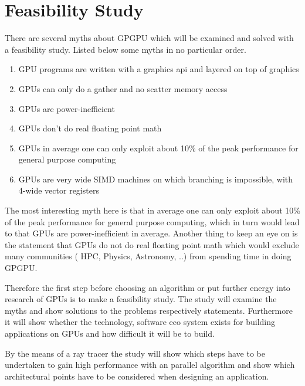 \chapter{Feasibility Study}
\label{chap:feas}
There are several myths about \gls{GPGPU} which will be examined and solved 
with a feasibility study. Listed below some myths in no particular order.
\begin{enumerate}
	\item \gls{GPU} programs are written with a graphics api and layered on top 
		of graphics
	\label{enum:api}
	\item \glspl{GPU} can only do a gather and no scatter memory access
	\label{enum:gather}
	\item \glspl{GPU} are power-inefficient
	\label{enum:ineff}
	\item \glspl{GPU} don't do real floating point math
	\label{enum:float}
	\item \glspl{GPU} in average one can only exploit about 10\% of the peak 
		performance for general purpose computing
	\label{enum:exploit}
	\item \glspl{GPU} are very wide \gls{SIMD} machines on which branching is 	  
		impossible, with 4-wide vector registers
 	\label{enum:simd}
\end{enumerate}

The most interesting myth here is that in average one can only exploit about
10\% of the peak performance for general purpose computing, which in turn would 
lead to that \glspl{GPU} are power-inefficient in average. Another thing to 
keep an eye on is the statement that \glspl{GPU} do not do real floating point
math which would exclude many communities ( \gls{HPC}, Physics, Astronomy, ..)
 from spending time in doing \gls{GPGPU}. 

Therefore the first step before choosing an algorithm or put further energy into
research of \glspl{GPU} is to make a feasibility study. The study will examine
the myths and show solutions to the problems respectively statements.
Furthermore it will show whether the technology, software eco system exists for
building applications on \glspl{GPU} and how difficult it will be to build.

By the means of a ray tracer the study will show which steps have to be 
undertaken to gain high performance with an parallel algorithm and show which 
architectural points have to be considered when designing an application.

